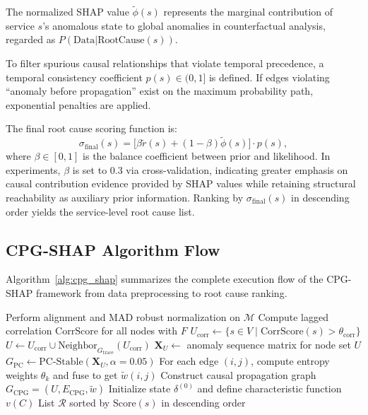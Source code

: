 \documentclass[conference]{IEEEtran}
\begin{document}
The normalized SHAP value $\tilde{\phi}(s)$ represents the marginal contribution of service $s$'s anomalous state to global anomalies in counterfactual analysis, regarded as $P(\text{Data} | \text{RootCause}(s))$.

To filter spurious causal relationships that violate temporal precedence, a temporal consistency coefficient $p(s) \in (0,1]$ is defined. If edges violating ``anomaly before propagation'' exist on the maximum probability path, exponential penalties are applied.

The final root cause scoring function is:
\begin{equation}
\sigma_{\text{final}}(s) = \big[\beta \tilde{r}(s) + (1-\beta) \tilde{\phi}(s)\big] \cdot p(s),
\end{equation}
where $\beta \in [0,1]$ is the balance coefficient between prior and likelihood. In experiments, $\beta$ is set to 0.3 via cross-validation, indicating greater emphasis on causal contribution evidence provided by SHAP values while retaining structural reachability as auxiliary prior information. Ranking by $\sigma_{\text{final}}(s)$ in descending order yields the service-level root cause list.

\subsection{CPG-SHAP Algorithm Flow}

Algorithm~\ref{alg:cpg_shap} summarizes the complete execution flow of the CPG-SHAP framework from data preprocessing to root cause ranking.

\begin{algorithm}[t]
\SetAlgoLined
\caption{CPG-SHAP Root Cause Localization Algorithm}
\label{alg:cpg_shap}
Perform alignment and MAD robust normalization on $\mathcal{M}$\;
Compute lagged correlation $\text{CorrScore}$ for all nodes with $F$\;
$U_{\text{corr}} \leftarrow \{s \in V \mid \text{CorrScore}(s) > \theta_{\text{corr}}\}$\;
$U \leftarrow U_{\text{corr}} \cup \text{Neighbor}_{G_{\text{trace}}}(U_{\text{corr}})$\;
$\mathbf{X}_{U} \leftarrow$ anomaly sequence matrix for node set $U$\;
$G_{\text{PC}} \leftarrow \text{PC-Stable}(\mathbf{X}_{U}, \alpha=0.05)$\;
For each edge $(i,j)$, compute entropy weights $\theta_k$ and fuse to get $\tilde{w}(i,j)$\;
Construct causal propagation graph $G_{\text{CPG}} = (U, E_{\text{CPG}}, \tilde{w})$\;
Initialize state $\delta^{(0)}$ and define characteristic function $v(C)$\;
\Return List $\mathcal{R}$ sorted by $\text{Score}(s)$ in descending order\;
\end{algorithm}
\end{document}
